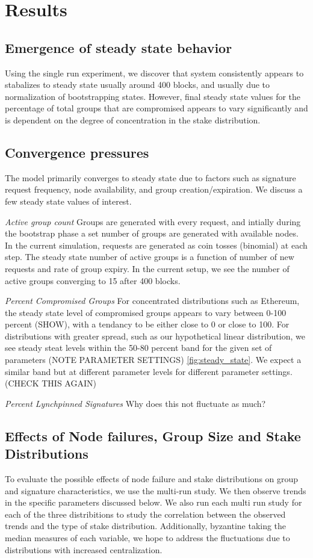 \documentclass[conference]{IEEEtran}
\begin{document}
\section{Results}
\subsection{Emergence of steady state behavior}
Using the single run experiment, we discover that system consistently appears to 
stabalizes to steady state usually around 400 blocks, and usually due to normalization of bootstrapping states. 
However, final steady state values for the percentage of total groups that are compromised
appears to vary significantly and is dependent on the degree of concentration in the 
stake distribution. 

\subsection{Convergence pressures}
The model primarily converges to steady state due to factors such as
signature request frequency, node availability, and group creation/expiration. We discuss a few
steady state values of interest.

\textit{Active group count} Groups are generated with every request, and intially
during the bootstrap phase a set number of groups are generated with available nodes. In the current
simulation, requests are generated as coin tosses (binomial) at each step. The steady state number of 
active groups is a function of number of new requests and rate of group expiry. In the current setup, 
we see the number of active groups converging to 15 after 400 blocks.

\textit{Percent Compromised Groups} For concentrated distributions such as Ethereum, the steady state level of compromised
groups appears to vary between 0-100 percent (SHOW), with a tendancy to be either close
to 0 or close to 100. For distributions with greater spread, such as our hypothetical linear
distribution, we see steady steat levels within the 50-80 percent band for the given set
of parameters (NOTE PARAMETER SETTINGS) \ref{fig:steady_state}. We expect a similar band but at
different parameter levels for different parameter settings. (CHECK THIS AGAIN)

\textit{Percent Lynchpinned Signatures} Why does this not fluctuate as much?

\subsection{Effects of Node failures, Group Size and Stake Distributions}
To evaluate the possible effects of node failure and stake distributions on group and signature 
characteristics, we use the multi-run study. We then observe trends in the specific parameters 
discussed below. We also run each multi run study for each of the three distribitions to study 
the correlation between the observed trends and the type of stake distribution. Additionally, byzantine
taking the median measures of each variable, we hope to address the fluctuations due to distributions with
increased centralization. 
\end{document}
